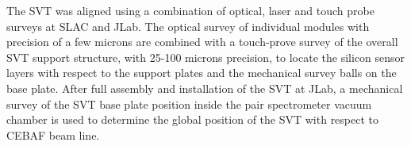 
The SVT was aligned using a combination of optical, laser and touch probe surveys at SLAC and JLab. The 
optical survey of individual modules with precision of a few microns are combined with a touch-prove survey 
of the overall SVT support structure, with 25-100 microns precision, to locate the silicon sensor layers with 
respect to the support plates and the mechanical survey balls on the base plate.
After full assembly and installation of the SVT at JLab, a mechanical survey of the SVT base plate position 
inside the pair spectrometer vacuum chamber is used to determine the global position of the SVT with respect 
to CEBAF beam line. 
